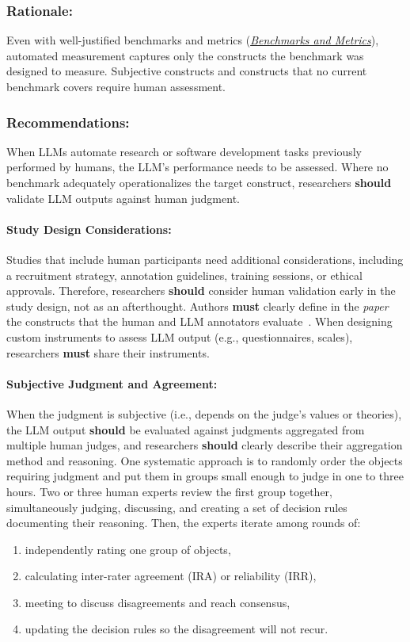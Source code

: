 \documentclass[smallextended]{svjour3}
\newcommand{\must}{\textbf{must}\xspace}
\newcommand{\should}{\textbf{should}\xspace}
\newcommand{\paper}{\emph{paper}\xspace}
\newcommand{\paper}{\emph{paper}\xspace}
\newcommand{\benchmarksmetrics}{\hyperref[sec:use-suitable-baselines-benchmarks-and-metrics]{\emph{Benchmarks and Metrics}}\xspace}
\newcommand{\benchmarksmetrics}{\href{/guidelines\#use-suitable-baselines-benchmarks-and-metrics}{\emph{Benchmarks and Metrics}}\xspace}
\newcommand{\guidelinesubsubsection}[1]{\subsubsection{\bfseries #1:}}
\newcommand{\guidelinesubsubsection}[1]{\subsubsection{#1}}
\begin{document}
\guidelinesubsubsection{Rationale}

Even with well-justified benchmarks and metrics (\benchmarksmetrics), automated measurement captures only the constructs the benchmark was designed to measure.
Subjective constructs and constructs that no current benchmark covers require human assessment.

\guidelinesubsubsection{Recommendations}

When LLMs automate research or software development tasks previously performed by humans, the LLM's performance needs to be assessed.
Where no benchmark adequately operationalizes the target construct, researchers \should validate LLM outputs against human judgment.

\paragraph{Study Design Considerations:}
Studies that include human participants need additional considerations, including a recruitment strategy, annotation guidelines, training sessions, or ethical approvals.
Therefore, researchers \should consider human validation early in the study design, not as an afterthought.
Authors \must clearly define in the \paper the constructs that the human and LLM annotators evaluate~\cite{DBLP:conf/ease/RalphT18}.
When designing custom instruments to assess LLM output (e.g., questionnaires, scales), researchers \must share their instruments.

\paragraph{Subjective Judgment and Agreement:}
When the judgment is subjective (i.e., depends on the judge's values or theories), the LLM output \should be evaluated against judgments aggregated from multiple human judges, and researchers \should clearly describe their aggregation method and reasoning. One systematic approach is to randomly order the objects requiring judgment and put them in groups small enough to judge in one to three hours. Two or three human experts review the first group together, simultaneously judging, discussing, and creating a set of decision rules documenting their reasoning. Then, the experts iterate among rounds of:
\begin{enumerate}
    \item independently rating one group of objects,
    \item calculating inter-rater agreement (IRA) or reliability (IRR),
    \item meeting to discuss disagreements and reach consensus,
    \item updating the decision rules so the disagreement will not recur.
\end{enumerate}
\end{document}

